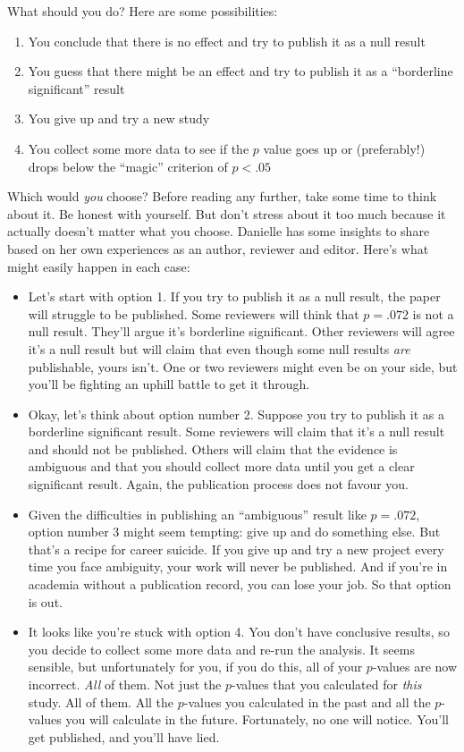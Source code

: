 \documentclass[
  11pt,
  a4paper,
  twoside,symmetric,openright]{book}
\providecommand{\tightlist}{%
  \setlength{\itemsep}{0pt}\setlength{\parskip}{0pt}}
\theoremstyle{break}
\theoremstyle{break}
\begin{document}
What should you do? Here are some possibilities:

\begin{enumerate}
\def\labelenumi{\arabic{enumi}.}
\tightlist
\item
  You conclude that there is no effect and try to publish it as a null result
\item
  You guess that there might be an effect and try to publish it as a ``borderline significant'' result
\item
  You give up and try a new study
\item
  You collect some more data to see if the \(p\) value goes up or (preferably!) drops below the ``magic'' criterion of \(p<.05\)
\end{enumerate}

Which would \emph{you} choose? Before reading any further, take some time to think about it. Be honest with yourself. But don't stress about it too much because it actually doesn't matter what you choose. Danielle has some insights to share based on her own experiences as an author, reviewer and editor. Here's what might easily happen in each case:

\begin{itemize}
\item
  Let's start with option 1. If you try to publish it as a null result, the paper will struggle to be published. Some reviewers will think that \(p=.072\) is not a null result. They'll argue it's borderline significant. Other reviewers will agree it's a null result but will claim that even though some null results \emph{are} publishable, yours isn't. One or two reviewers might even be on your side, but you'll be fighting an uphill battle to get it through.
\item
  Okay, let's think about option number 2. Suppose you try to publish it as a borderline significant result. Some reviewers will claim that it's a null result and should not be published. Others will claim that the evidence is ambiguous and that you should collect more data until you get a clear significant result. Again, the publication process does not favour you.
\item
  Given the difficulties in publishing an ``ambiguous'' result like \(p=.072\), option number 3 might seem tempting: give up and do something else. But that's a recipe for career suicide. If you give up and try a new project every time you face ambiguity, your work will never be published. And if you're in academia without a publication record, you can lose your job. So that option is out.
\item
  It looks like you're stuck with option 4. You don't have conclusive results, so you decide to collect some more data and re-run the analysis. It seems sensible, but unfortunately for you, if you do this, all of your \(p\)-values are now incorrect. \emph{All} of them. Not just the \(p\)-values that you calculated for \emph{this} study. All of them. All the \(p\)-values you calculated in the past and all the \(p\)-values you will calculate in the future. Fortunately, no one will notice. You'll get published, and you'll have lied.
\end{itemize}
\end{document}
